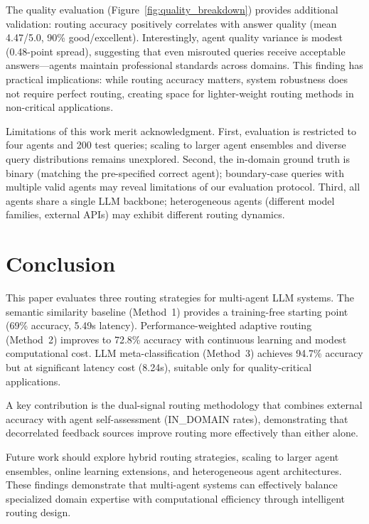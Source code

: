 \documentclass[11pt]{article}
\begin{document}
The quality evaluation (Figure~\ref{fig:quality_breakdown}) provides additional validation: routing accuracy positively correlates with answer quality (mean 4.47/5.0, 90\% good/excellent). Interestingly, agent quality variance is modest (0.48-point spread), suggesting that even misrouted queries receive acceptable answers—agents maintain professional standards across domains. This finding has practical implications: while routing accuracy matters, system robustness does not require perfect routing, creating space for lighter-weight routing methods in non-critical applications.

Limitations of this work merit acknowledgment. First, evaluation is restricted to four agents and 200 test queries; scaling to larger agent ensembles and diverse query distributions remains unexplored. Second, the in-domain ground truth is binary (matching the pre-specified correct agent); boundary-case queries with multiple valid agents may reveal limitations of our evaluation protocol. Third, all agents share a single LLM backbone; heterogeneous agents (different model families, external APIs) may exhibit different routing dynamics.

\section{Conclusion}

This paper evaluates three routing strategies for multi-agent LLM systems. The semantic similarity baseline (Method~1) provides a training-free starting point (69\% accuracy, 5.49s latency). Performance-weighted adaptive routing (Method~2) improves to 72.8\% accuracy with continuous learning and modest computational cost. LLM meta-classification (Method~3) achieves 94.7\% accuracy but at significant latency cost (8.24s), suitable only for quality-critical applications.

A key contribution is the dual-signal routing methodology that combines external accuracy with agent self-assessment (IN\_DOMAIN rates), demonstrating that decorrelated feedback sources improve routing more effectively than either alone.

Future work should explore hybrid routing strategies, scaling to larger agent ensembles, online learning extensions, and heterogeneous agent architectures. These findings demonstrate that multi-agent systems can effectively balance specialized domain expertise with computational efficiency through intelligent routing design.
\end{document}

